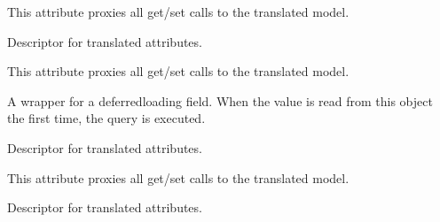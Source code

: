 \documentclass[letterpaper,10pt,english]{sphinxmanual}
\begin{document}
\begin{fulllineitems}
\begin{fulllineitems}
\sphinxAtStartPar
This attribute proxies all get/set calls to the translated model.

\end{fulllineitems}


\begin{fulllineitems}
\label{\detokenize{index:bookings.models.SeasonInfo.high_season_start}}
\pysigstartsignatures
\pysigline
{}
\pysigstopsignatures
\sphinxAtStartPar
Descriptor for translated attributes.

\sphinxAtStartPar
This attribute proxies all get/set calls to the translated model.

\end{fulllineitems}


\begin{fulllineitems}
\label{\detokenize{index:bookings.models.SeasonInfo.id}}
\pysigstartsignatures
\pysigline
{}
\pysigstopsignatures
\sphinxAtStartPar
A wrapper for a deferred\sphinxhyphen{}loading field. When the value is read from this
object the first time, the query is executed.

\end{fulllineitems}


\begin{fulllineitems}
\label{\detokenize{index:bookings.models.SeasonInfo.low_season_end}}
\pysigstartsignatures
\pysigline
{}
\pysigstopsignatures
\sphinxAtStartPar
Descriptor for translated attributes.

\sphinxAtStartPar
This attribute proxies all get/set calls to the translated model.

\end{fulllineitems}


\begin{fulllineitems}
\label{\detokenize{index:bookings.models.SeasonInfo.low_season_start}}
\pysigstartsignatures
\pysigline
{}
\pysigstopsignatures
\sphinxAtStartPar
Descriptor for translated attributes.


\end{fulllineitems}
\end{fulllineitems}
\end{document}
